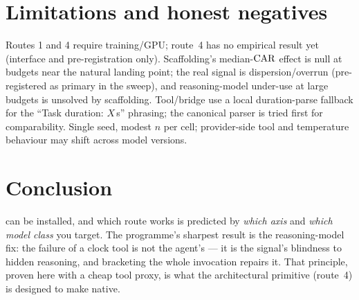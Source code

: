 \documentclass[11pt]{article}
\begin{document}
\section{Limitations and honest negatives}
Routes 1 and 4 require training/GPU; route~4 has no empirical result yet
(interface and pre-registration only). Scaffolding's median-$\mathrm{CAR}$ effect is null
at budgets near the natural landing point; the real signal is dispersion/overrun
(pre-registered as primary in the sweep), and reasoning-model under-use at large
budgets is unsolved by scaffolding. Tool/bridge use a local duration-parse
fallback for the ``Task duration: $X$\,s'' phrasing; the canonical parser is
tried first for comparability. Single seed, modest $n$ per cell; provider-side
tool and temperature behaviour may shift across model versions.

\section{Conclusion}
\Chrono{} can be installed, and which route works is predicted by \emph{which
axis} and \emph{which model class} you target. The programme's sharpest result is
the reasoning-model fix: the failure of a clock tool is not the agent's --- it is
the signal's blindness to hidden reasoning, and bracketing the whole invocation
repairs it. That principle, proven here with a cheap tool proxy, is what the
architectural primitive (route~4) is designed to make native.
\end{document}
